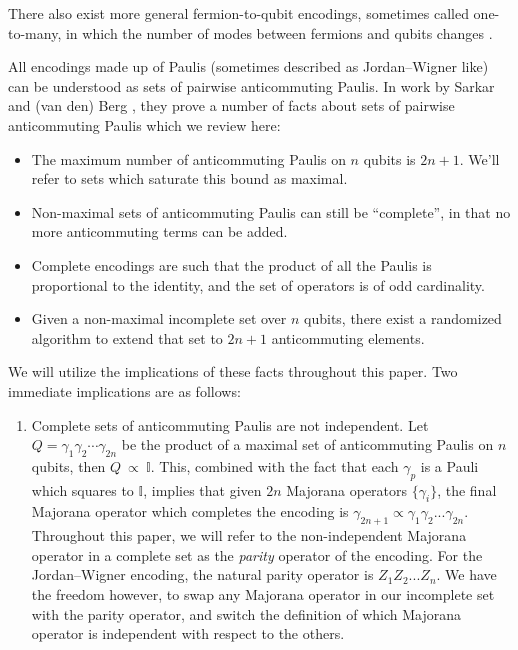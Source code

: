 \documentclass[%
 aip,
 amsmath,amssymb,
 reprint,%
]{revtex4-1}
\newcommand{\Id}{\mathbb{I}}       %
\begin{document}
\indent There also exist more general fermion-to-qubit encodings, sometimes called one-to-many, in which the number of modes between fermions and qubits changes \cite{ Derby_2021, Setia_2019}. { All encodings made up of Paulis (sometimes described as Jordan--Wigner like) can be understood %
as sets of pairwise anticommuting Paulis. 
\indent In work by Sarkar and (van den) Berg \cite{sarkar2019setscommutinganticommutingpaulis}, they prove a number of %
facts about sets of pairwise anticommuting Paulis which we review here: 
\begin{itemize}
    \item The maximum number of anticommuting Paulis on $n$ qubits is $2n+1$. We'll refer to sets which saturate this bound as maximal. 
    \item Non-maximal sets of anticommuting Paulis can still be \enquote{complete}, in that no more anticommuting terms can be added. 
    \item Complete encodings are such that the product of all the Paulis %
    is proportional to the identity, and the set of operators is of odd cardinality.  
    \item Given a non-maximal incomplete set over $n$ qubits, there exist a randomized algorithm to extend that set to $2n+1$ anticommuting elements. 
\end{itemize}
We will utilize the implications of these facts throughout this paper. 
Two %
immediate implications are as follows:
\begin{enumerate}
\item Complete sets of anticommuting Paulis are not independent. Let $Q = \gamma_1 \gamma_2\cdots \gamma_{2n}$ be the product of a maximal set of anticommuting Paulis on $n$ qubits, then $Q%
~{\propto}~ \Id$. This, combined with the fact that each $\gamma_p$ is a Pauli which squares to $\Id$, implies that given $2n$ Majorana operators $\{\gamma_i\}$, the final Majorana operator which completes the encoding is $\gamma_{2n+1} \propto \gamma_1 \gamma_2 ... \gamma_{2n}$. Throughout this paper, we will refer to the non-independent Majorana operator in a complete set as the {\it parity} operator of the encoding. For the Jordan--Wigner encoding, the natural parity operator is $Z_1Z_2...Z_n$. We have the freedom however, to swap any Majorana operator in our incomplete set with the parity operator, and switch the definition of which Majorana operator is independent with respect to the others. 

\end{enumerate}}
\end{document}
